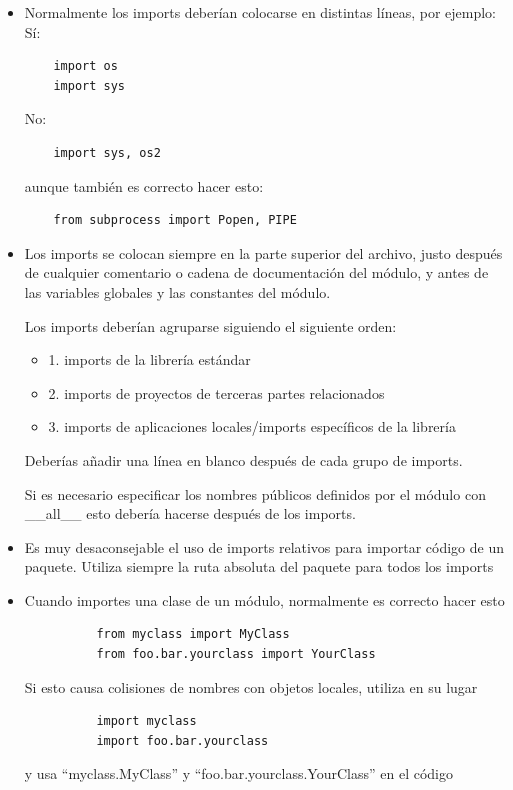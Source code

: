 \documentclass[a4paper,11pt,oneside]{book}
\begin{document}
\begin{itemize}
\item Normalmente los imports deberían colocarse en distintas líneas, por ejemplo:
Sí:
\begin{lstlisting}
    import os
    import sys
\end{lstlisting}
No:
\begin{lstlisting}
    import sys, os2
\end{lstlisting}
aunque también es correcto hacer esto:
\begin{lstlisting}
    from subprocess import Popen, PIPE
\end{lstlisting}
\item Los imports se colocan siempre en la parte superior del archivo, justo después de cualquier comentario o cadena de documentación del módulo, y antes de las variables globales y las constantes del módulo.

Los imports deberían agruparse siguiendo el siguiente orden:
\begin{itemize}
\item   1. imports de la librería estándar
\item   2. imports de proyectos de terceras partes relacionados
\item   3. imports de aplicaciones locales/imports específicos de la librería
\end{itemize}
Deberías añadir una línea en blanco después de cada grupo de imports.

Si es necesario especificar los nombres públicos definidos por el módulo con \_\_all\_\_ esto debería hacerse después de los imports.

\item Es muy desaconsejable el uso de imports relativos para importar código de un paquete. Utiliza siempre la ruta absoluta del paquete para todos los imports

\item Cuando importes una clase de un módulo, normalmente es correcto hacer esto
\begin{lstlisting}
          from myclass import MyClass
          from foo.bar.yourclass import YourClass
\end{lstlisting}
      Si esto causa colisiones de nombres con objetos locales, utiliza en su lugar
\begin{lstlisting}
          import myclass
          import foo.bar.yourclass
\end{lstlisting}
      y usa ``myclass.MyClass'' y ``foo.bar.yourclass.YourClass'' en el código
\end{itemize}
\end{document}
